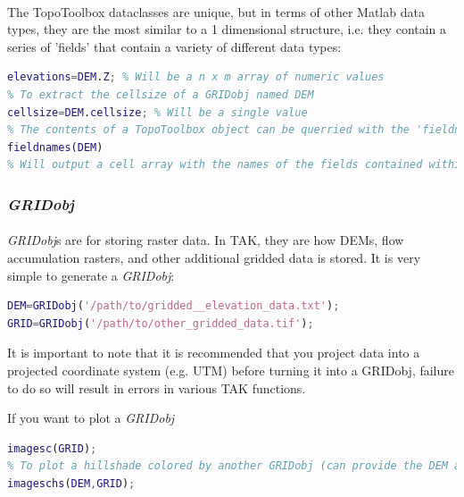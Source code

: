 \paragraph{}The TopoToolbox dataclasses are unique, but in terms of other Matlab data types, they are the most similar to a 1 dimensional structure, i.e. they contain a series of 'fields' that contain a variety of different data types:

\begin{lstlisting}[language=Matlab]
% To extract the data array within a GRIDobj named DEM
elevations=DEM.Z; % Will be a n x m array of numeric values
% To extract the cellsize of a GRIDobj named DEM
cellsize=DEM.cellsize; % Will be a single value
% The contents of a TopoToolbox object can be querried with the 'fieldnames' function, just like a structure
fieldnames(DEM)
% Will output a cell array with the names of the fields contained within DEM
\end{lstlisting}

\subsubsection{\textit{GRIDobj}}
\paragraph{}\textit{GRIDobj}s are for storing raster data. In TAK, they are how DEMs, flow accumulation rasters, and other additional gridded data is stored. It is very simple to generate a \textit{GRIDobj}:

\begin{lstlisting}[language=Matlab]
% GRIDobjs can be created from ascii grids or geotiffs
DEM=GRIDobj('/path/to/gridded__elevation_data.txt');
GRID=GRIDobj('/path/to/other_gridded_data.tif');
\end{lstlisting}

\noindent
It is important to note that it is recommended that you project data into a projected coordinate system (e.g. UTM) before turning it into a GRIDobj, failure to do so will result in errors in various TAK functions.

\noindent
If you want to plot a \textit{GRIDobj}

\begin{lstlisting}[language=Matlab]
% To plot a single GRIDobj
imagesc(GRID);
% To plot a hillshade colored by another GRIDobj (can provide the DEM as the second input to color by elevation)
imageschs(DEM,GRID);
\end{lstlisting}


